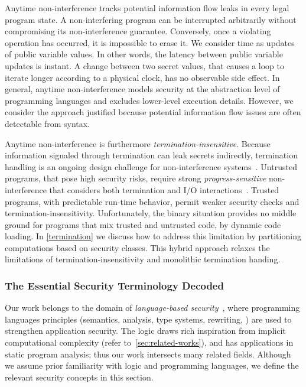 Anytime non-interference tracks potential information flow leaks in every legal program state.
A non-interfering program can be interrupted arbitrarily without compromising its non-interference guarantee.
Conversely, once a violating operation has occurred, it is impossible to erase it.
We consider time as %
updates of public variable values.
In other words, the latency between public variable updates is instant.
A change between two secret values, that causes a loop to iterate longer according to a physical clock, has no observable side effect.
In general, anytime non-interference models security at the abstraction level of programming languages and excludes lower-level execution details.
However, we consider the approach justified because potential information flow issues are often detectable from syntax.

Anytime non-interference is furthermore \emph{termination-insensitive}.
Because information signaled through termination can leak secrets indirectly, termination handling is an ongoing design challenge for non-interference systems~\cite{bay2020}.
Untrusted programs, that pose high security risks, require strong \emph{progress-sensitive} non-interference that considers both termination and I/O interactions~\cite{hedin2012}.
Trusted programs, with predictable run-time behavior, permit weaker security checks and termination-insensitivity.
Unfortunately, the binary situation provides no middle ground for programs that mix trusted and untrusted code, \eg by dynamic code loading.
In \autoref{termination} we discuss how to address this limitation by partitioning computations based on security classes.
This hybrid approach relaxes the limitations of termination-insensitivity and monolithic termination handing.

\subsubsection{The Essential Security Terminology Decoded}\label{subsec:terms}

Our work belongs to the domain of \emph{language-based security}~\cite{schneider2001,sabelfeld2003},
where programming languages principles (semantics, analysis, type systems, rewriting, \etc) are used to strengthen application security.
The \lname logic draws rich inspiration from implicit computational complexity (refer to~\autoref{sec:related-works}),
and has applications in static program analysis;
thus our work intersects many related fields.
Although we assume prior familiarity with logic and programming languages, we define the relevant security concepts in this section.

